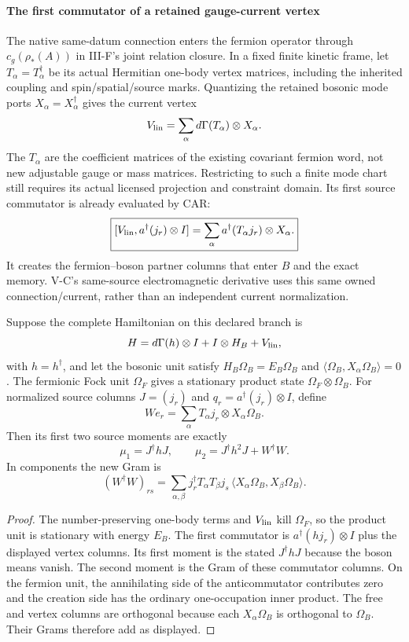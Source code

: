 \documentclass[12pt,a4paper]{article}
\begin{document}
\paragraph{The first commutator of a retained gauge-current vertex}
The native same-datum connection enters the fermion operator through
$c_g(\rho_*(A))$ in III-F's joint relation closure. In a fixed finite kinetic
frame, let $T_\alpha=T_\alpha^\dagger$ be its actual Hermitian one-body
vertex matrices, including the inherited coupling and spin/spatial/source
marks. Quantizing the retained bosonic mode ports $X_\alpha=X_\alpha^\dagger$
gives the current vertex
\[
 V_{\rm lin}=\sum_\alpha d\Gamma(T_\alpha)\otimes X_\alpha.
\]
The $T_\alpha$ are the coefficient matrices of the existing covariant
fermion word, not new adjustable gauge or mass matrices. Restricting to such
a finite mode chart still requires its actual licensed projection and
constraint domain. Its first source commutator is already evaluated by CAR:
\[
 \boxed{[V_{\rm lin},a^\dagger(j_r)\otimes I]
       =\sum_\alpha a^\dagger(T_\alpha j_r)\otimes X_\alpha.}
\]
It creates the fermion--boson partner columns that enter $B$ and the exact
memory. V-C's same-source electromagnetic derivative uses this same owned
connection/current, rather than an independent current normalization.

\begin{proposition}
\label{p4:prop:v2168-product-unit-vertex-moment}
Suppose the complete Hamiltonian on this declared branch is
\[
 H=d\Gamma(h)\otimes I+I\otimes H_B+V_{\rm lin},
\]
with $h=h^\dagger$, and let the bosonic unit satisfy
$H_B\Omega_B=E_B\Omega_B$ and
$\langle\Omega_B,X_\alpha\Omega_B\rangle=0$. The fermionic Fock unit
$\Omega_F$ gives a stationary product state
$\Omega_F\otimes\Omega_B$. For normalized source columns $J=(j_r)$ and
$q_r=a^\dagger(j_r)\otimes I$, define
\[
 We_r=\sum_\alpha T_\alpha j_r\otimes X_\alpha\Omega_B.
\]
Then its first two source moments are exactly
\[
 \boxed{\mu_1=J^\dagger hJ,\qquad
        \mu_2=J^\dagger h^2J+W^\dagger W.}
\]
In components the new Gram is
\[
 (W^\dagger W)_{rs}
 =\sum_{\alpha,\beta}j_r^\dagger T_\alpha T_\beta j_s\,
 \langle X_\alpha\Omega_B,X_\beta\Omega_B\rangle.
\]
\end{proposition}
\begin{proof}
The number-preserving one-body terms and $V_{\rm lin}$ kill $\Omega_F$,
so the product unit is stationary with energy $E_B$. The first commutator
is $a^\dagger(hj_r)\otimes I$ plus the displayed vertex columns. Its first
moment is the stated $J^\dagger hJ$ because the boson means vanish. The
second moment is the Gram of these commutator columns. On the fermion unit,
the annihilating side of the anticommutator contributes zero and the creation
side has the ordinary one-occupation inner product. The free and vertex
columns are orthogonal because each $X_\alpha\Omega_B$ is orthogonal to
$\Omega_B$. Their Grams therefore add as displayed.
\end{proof}
\end{document}
